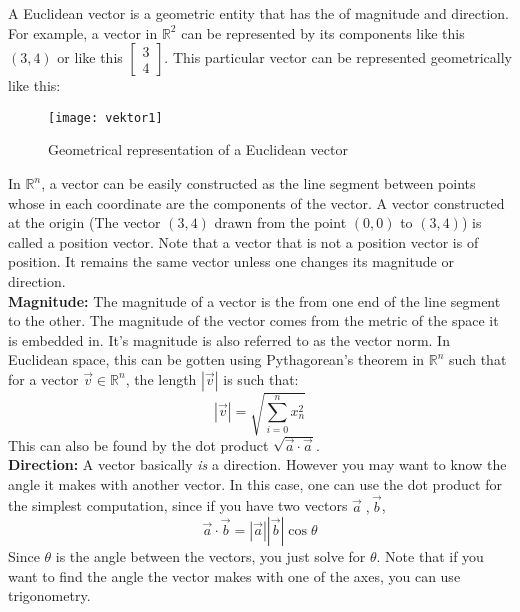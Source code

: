 \documentclass{article}
\begin{document}

A Euclidean vector is a geometric entity that has the  of magnitude and direction. For example, a vector in $\mathbb{R}^2$ can be represented by its components like this $(3,4)$ or like this $\left[\begin{array}{c}3\\4\end{array}\right]$. This particular vector can be represented geometrically like this:
\begin{figure}[htbp]
\begin{centering}
\texttt{[image: vektor1]}
\caption{Geometrical representation of a Euclidean vector}
\end{centering}
\end{figure}
In $\mathbb{R}^n$, a vector can be easily constructed as the line segment between points whose  in each coordinate are the components of the vector. A vector constructed at the origin (The vector $(3,4)$ drawn from the point $(0,0)$ to $(3,4)$) is called a position vector. Note that a vector that is not a position vector is  of position. It remains the same vector unless one changes its magnitude or direction.\\
\textbf{Magnitude:} The magnitude of a vector is the  from one end of the line segment to the other. The magnitude of the vector comes from the metric of the space it is embedded in. It's magnitude is also referred to as the vector norm. In Euclidean space, this can be gotten using Pythagorean's theorem in $\mathbb{R}^n$ such that for a vector $\vec{v}\in\mathbb{R}^n$, the length $|\vec{v}|$ is such that:
$$|\vec{v}|=\sqrt{\sum_{i=0}^n x_n^2}$$
This can also be found by the dot product $\sqrt{\vec{a}\cdot\vec{a}}$.\\
\textbf{Direction:} A vector basically \emph{is} a direction. However you may want to know the angle it makes with another vector. In this case, one can use the dot product for the simplest computation, since if you have two vectors $\vec{a}\; ,\vec{b}$, $$\vec{a}\cdot\vec{b} = |\vec{a}||\vec{b}|\cos\theta$$
Since $\theta$ is the angle between the vectors, you just solve for $\theta$. Note that if you want to find the angle the vector makes with one of the axes, you can use trigonometry.
\end{document}
